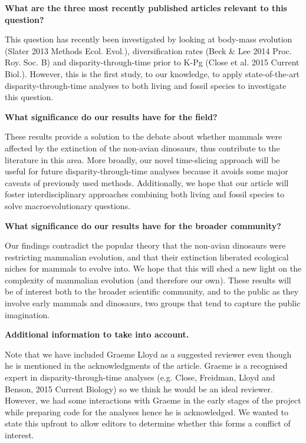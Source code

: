 \documentclass[11pt]{letter}
\begin{document}
\begin{letter}{}
\textbf{What are the three most recently published articles relevant to this question?}

This question has recently been investigated by looking at body-mass evolution (Slater 2013 Methods Ecol. Evol.), diversification rates (Beck \& Lee 2014 Proc. Roy. Soc. B)
 and disparity-through-time prior to K-Pg (Close et al. 2015 Current Biol.).
However, this is the first study, to our knowledge, to apply state-of-the-art disparity-through-time analyses to both living and fossil species to investigate this question.

\textbf{What significance do our results have for the field?}

These results provide a solution to the debate about whether mammals were affected by the extinction of the non-avian dinosaurs, thus contribute to the literature in this area.
More broadly, our novel time-slicing approach will be useful for future disparity-through-time analyses because it avoids some major caveats of previously used methods.
Additionally, we hope that our article will foster interdisciplinary approaches combining both living and fossil species to solve macroevolutionary questions.

\textbf{What significance do our results have for the broader community?}

Our findings contradict the popular theory that the non-avian dinosaurs were restricting mammalian evolution, and that their extinction liberated ecological niches for mammals to evolve into.
We hope that this will shed a new light on the complexity of mammalian evolution (and therefore our own).
These results will be of interest both to the broader scientific community, and to the public as they involve early mammals and dinosaurs, two groups that tend to capture the public imagination.


\textbf{Additional information to take into account.}

Note that we have included Graeme Lloyd as a suggested reviewer even though he is mentioned in the acknowledgments of the article.
Graeme is a recognised expert in disparity-through-time analyses (e.g. Close, Freidman, Lloyd and Benson, 2015 Current Biology) so we think he would be an ideal reviewer.
However, we had some interactions with Graeme in the early stages of the project while preparing code for the analyses hence he is acknowledged.
We wanted to state this upfront to allow editors to determine whether this forms a conflict of interest.


\end{letter}
\end{document}
